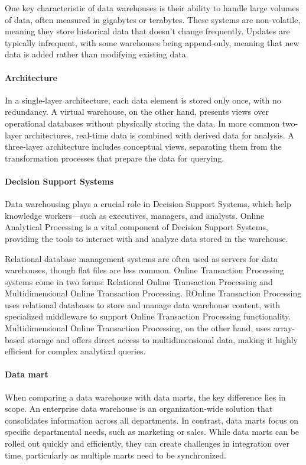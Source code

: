 One key characteristic of data warehouses is their ability to handle large volumes of data, often measured in gigabytes or terabytes. 
These systems are non-volatile, meaning they store historical data that doesn't change frequently. 
Updates are typically infrequent, with some warehouses being append-only, meaning that new data is added rather than modifying existing data.

\paragraph*{Architecture}
In a single-layer architecture, each data element is stored only once, with no redundancy. 
A virtual warehouse, on the other hand, presents views over operational databases without physically storing the data. 
In more common two-layer architectures, real-time data is combined with derived data for analysis. 
A three-layer architecture includes conceptual views, separating them from the transformation processes that prepare the data for querying.

\paragraph*{Decision Support Systems}
Data warehousing plays a crucial role in Decision Support Systems, which help knowledge workers—such as executives, managers, and analysts. 
Online Analytical Processing is a vital component of Decision Support Systems, providing the tools to interact with and analyze data stored in the warehouse.

Relational database management systems are often used as servers for data warehouses, though flat files are less common. 
Online Transaction Processing systems come in two forms: Relational Online Transaction Processing and Multidimensional Online Transaction Processing. 
ROnline Transaction Processing uses relational databases to store and manage data warehouse content, with specialized middleware to support Online Transaction Processing functionality. 
Multidimensional Online Transaction Processing, on the other hand, uses array-based storage and offers direct access to multidimensional data, making it highly efficient for complex analytical queries.

\paragraph*{Data mart}
When comparing a data warehouse with data marts, the key difference lies in scope.
An enterprise data warehouse is an organization-wide solution that consolidates information across all departments.
In contrast, data marts focus on specific departmental needs, such as marketing or sales.
While data marts can be rolled out quickly and efficiently, they can create challenges in integration over time, particularly as multiple marts need to be synchronized.

